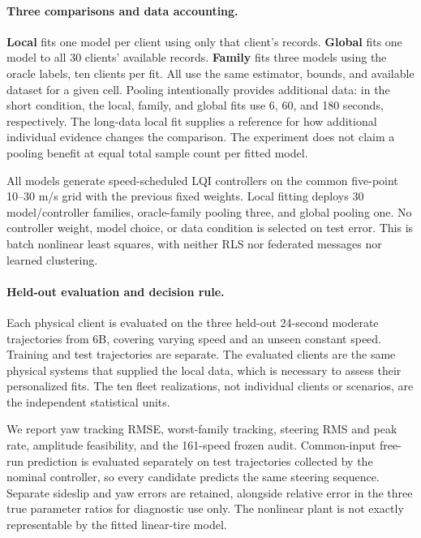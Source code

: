 \paragraph{Three comparisons and data accounting.}
\textbf{Local} fits one model per client using only that client's records.
\textbf{Global} fits one model to all 30 clients' available records.
\textbf{Family} fits three models using the oracle labels, ten clients per fit.
All use the same estimator, bounds, and available dataset for a given cell.
Pooling intentionally provides additional data: in the short condition, the
local, family, and global fits use 6, 60, and 180 seconds, respectively.
The long-data local fit supplies a reference for how additional individual
evidence changes the comparison. The experiment does not claim a pooling
benefit at equal total sample count per fitted model.

All models generate speed-scheduled LQI controllers on the common five-point
10--30 m/s grid with the previous fixed weights. Local fitting deploys 30
model/controller families, oracle-family pooling three, and global pooling one.
No controller weight, model choice, or data condition is selected on test error.
This is batch nonlinear least squares, with neither RLS nor federated messages
nor learned clustering.

\paragraph{Held-out evaluation and decision rule.}
Each physical client is evaluated on the three held-out 24-second moderate
trajectories from 6B, covering varying speed and an unseen constant speed.
Training and test trajectories are separate. The evaluated clients are the
same physical systems that supplied the local data, which is necessary to
assess their personalized fits. The ten fleet realizations, not individual
clients or scenarios, are the independent statistical units.

We report yaw tracking RMSE, worst-family tracking, steering RMS and peak rate,
amplitude feasibility, and the 161-speed frozen audit. Common-input free-run
prediction is evaluated separately on test trajectories collected by the
nominal controller, so every candidate predicts the same steering sequence.
Separate sideslip and yaw errors are retained, alongside relative error in
the three true parameter ratios for diagnostic use only. The nonlinear plant
is not exactly representable by the fitted linear-tire model.

